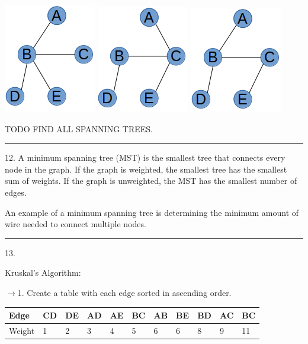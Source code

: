 \documentclass{article}
\begin{document}
\includegraphics[scale=0.5]{./P11/5}
\includegraphics[scale=0.5]{./P11/6}
\includegraphics[scale=0.5]{./P11/7}


TODO FIND ALL SPANNING TREES. 

\noindent\rule{8cm}{0.4pt}

12. A minimum spanning tree (MST) is the smallest tree that connects every node in the graph. If the graph is weighted, the smallest tree has the smallest sum of weights. If the graph is unweighted, the MST has the smallest number of edges. 

An example of a minimum spanning tree is determining the minimum amount of wire needed to connect multiple nodes. 

\noindent\rule{8cm}{0.4pt}

13. 

Kruskal's Algorithm: 

$\rightarrow$1. Create a table with each edge sorted in ascending order. 
\begin{table}[H]
\begin{tabular}{|l|l|l|l|l|l|l|l|l|l|l|}
\hline
Edge & CD & DE & AD & AE & BC & AB & BE & BD & AC & BC \\ \hline
Weight & 1 & 2 & 3 & 4 & 5 & 6 & 6 & 8 & 9 & 11 \\ \hline
\end{tabular}
\end{table}
\end{document}
